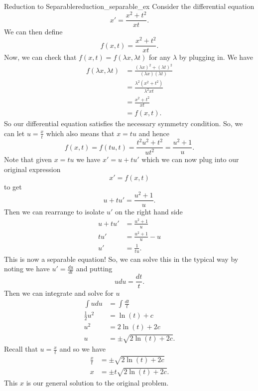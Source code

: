         \begin{ex}{Reduction to Separable}{reduction_separable_ex}
            Consider the differential equation
            \[
            x'=\frac{x^2+t^2}{xt}.
            \]
            We can then define
            \[
            f(x,t)=\frac{x^2+t^2}{xt}.
            \]
            Now, we can check that $f(x,t)=f(\lambda x, \lambda t)$ for any $\lambda$ by plugging in.  We have
            \begin{align*}
            f(\lambda x, \lambda t) &= \frac{(\lambda x)^2+(\lambda t)^2}{(\lambda x)(\lambda t)}\\
            &= \frac{\lambda^2(x^2+t^2)}{\lambda^2 xt}\\
            &= \frac{x^2+t^2}{xt}\\
            &=f(x,t).
            \end{align*}
            So our differential equation satisfies the necessary symmetry condition.  So, we can let $u=\frac{x}{t}$ which also means that $x=tu$ and hence
            \[
            f(x,t)=f(tu,t)=\frac{t^2u^2+t^2}{ut^2}=\frac{u^2+1}{u}.
            \]
            Note that given $x=tu$ we have $x'=u+tu'$ which we can now plug into our original expression
            \[
            x'=f(x,t)
            \]
            to get
            \[
            u+tu'=\frac{u^2+1}{u}.
            \]
            Then we can rearrange to isolate $u'$ on the right hand side
            \begin{align*}
                u+tu'&=\frac{u^2+1}{u}\\
                tu'&= \frac{u^2+1}{u}-u\\
                u'&= \frac{1}{tu}.
            \end{align*}
            This is now a separable equation! So, we can solve this in the typical way by noting we have $u'=\frac{du}{dt}$ and putting
            \[
            udu=\frac{dt}{t}.
            \]
            Then we can integrate and solve for $u$
            \begin{align*}
                \int udu &= \int \frac{dt}{t}\\
                \frac{1}{2}u^2 &= \ln(t)+c\\
                u^2&= 2\ln(t)+2c\\
                u&=\pm \sqrt{2\ln(t)+2c}.
            \end{align*}
            Recall that $u=\frac{x}{t}$ and so we have
            \begin{align*}
                \frac{x}{t}&= \pm \sqrt{2\ln(t)+2c}\\
                x&= \pm t\sqrt{2\ln(t)+2c}.
            \end{align*}
            This $x$ is our general solution to the original problem.
        \end{ex}
        

